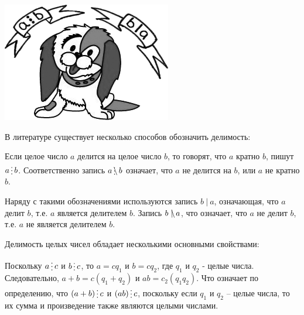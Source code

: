 
\begin{floatingfigure}[r]{0.25\textwidth}
	\includegraphics[scale=0.45]{./img/dog}
\end{floatingfigure}
В литературе существует несколько способов обозначить делимость:

Если целое число $a$ делится на целое число $b$, то говорят, что $a$ кратно $b$, пишут $a\del b$. Соответственно запись $a\ndel b$ означает, что $a$ не делится на $b$, или $a$ не кратно $b$. 


Наряду с такими обозначениями используются запись $b~|~a$, означающая, что $a$ делит $b$, т.е. $a$ является делителем $b$. Запись $b~\mathrlap{\backslash}|~a$, что означает, что $a$ не делит $b$, т.е. $a$ не является делителем $b$.


Делимость целых чисел обладает несколькими основными свойствами:


\begin{dok}
    Поскольку $a\del c$ и $b\del c$, то $a = cq_1$ и $b = cq_2$, где $q_1$ и $q_2$ - целые числа. Следовательно,  $a + b = c(q_1 + q_2)$ и $ab = c_2(q_1q_2)$. Что означает по определению, что $(a + b) \del c$ и $(ab) \del c$, поскольку если    $q_1$ и $q_2$ – целые числа, то их сумма и произведение также являются целыми числами. 
\end{dok}

